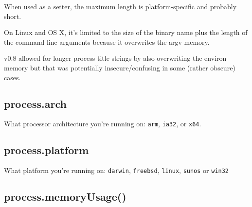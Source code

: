 When used as a setter, the maximum length is platform-specific and
probably short.

On Linux and OS X, it's limited to the size of the binary name plus the
length of the command line arguments because it overwrites the argv
memory.

v0.8 allowed for longer process title strings by also overwriting the
environ memory but that was potentially insecure/confusing in some
(rather obscure) cases.

\subsection{process.arch}\label{process.arch}

What processor architecture you're running on:
\texttt{\textquotesingle{}arm\textquotesingle{}},
\texttt{\textquotesingle{}ia32\textquotesingle{}}, or
\texttt{\textquotesingle{}x64\textquotesingle{}}.

\begin{Shaded}
\begin{Highlighting}[]
\NormalTok{(} \NormalTok{+ }\NormalTok{);}
\end{Highlighting}
\end{Shaded}

\subsection{process.platform}\label{process.platform}

What platform you're running on:
\texttt{\textquotesingle{}darwin\textquotesingle{}},
\texttt{\textquotesingle{}freebsd\textquotesingle{}},
\texttt{\textquotesingle{}linux\textquotesingle{}},
\texttt{\textquotesingle{}sunos\textquotesingle{}} or
\texttt{\textquotesingle{}win32\textquotesingle{}}

\begin{Shaded}
\begin{Highlighting}[]
\NormalTok{(} \NormalTok{+ }\NormalTok{);}
\end{Highlighting}
\end{Shaded}

\subsection{process.memoryUsage()}\label{process.memoryusage}

